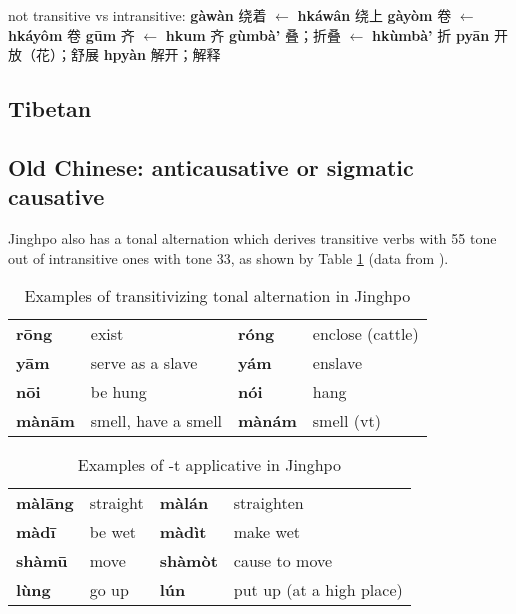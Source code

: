\documentclass[oneside,a4paper,11pt]{article}
\newcommand{\ipa}[1]{\textbf{{\phon\mbox{#1}}}} %
\newcommand{\zh}[1]{{\cn #1}}
\begin{document}
not transitive vs intransitive:
 \ipa{gàwàn} \zh{绕着} $\leftarrow$ \ipa{hkáwân} \zh{绕上} %
 \ipa{gàyòm} \zh{卷} $\leftarrow$ \ipa{hkáyôm} \zh{卷} %
 \ipa{gūm} \zh{齐} $\leftarrow$ \ipa{hkum} \zh{齐} %
  \ipa{gùmbà'} \zh{叠；折叠} $\leftarrow$ \ipa{hkùmbà'} \zh{折} 
\ipa{pyān} \zh{开放（花）；舒展}  \ipa{hpyàn} \zh{解开；解释} %

\subsection{Tibetan}
\subsection{Old Chinese: anticausative or sigmatic causative}
 
Jinghpo also has a tonal alternation which derives transitive verbs with 55 tone out of intransitive ones with tone 33, as shown by Table \ref{tab:jinghpo.tone} (data from  \citet[78]{dai92yufa}).

\begin{table}
\caption{Examples of transitivizing tonal alternation in Jinghpo} \label{tab:jinghpo.tone} \centering
\begin{tabular}{llll}
\toprule
\ipa{rōng} &exist &\ipa{róng} &enclose (cattle) \\
\ipa{yām} &serve as a slave &\ipa{yám} &enslave \\
\ipa{nōi} &be hung &\ipa{nói} &hang \\
\ipa{mànām} &smell, have a smell &\ipa{mànám} &smell (vt) \\
\bottomrule
\end{tabular}
\end{table}
 
 
 \begin{table}
\caption{Examples of -t applicative in Jinghpo} \label{tab:jinghpo.appl} \centering
\begin{tabular}{llll}
\toprule
\ipa{màlāng} &straight &\ipa{màlán} &straighten \\
\ipa{màdī} &be wet &\ipa{màdìt} &make wet \\
\ipa{shàmū} &move &\ipa{shàmòt} &cause to move \\
\ipa{lùng} &go up&\ipa{lún} &put up (at a high place) \\
\bottomrule
\end{tabular}
\end{table}
 
\end{document}
